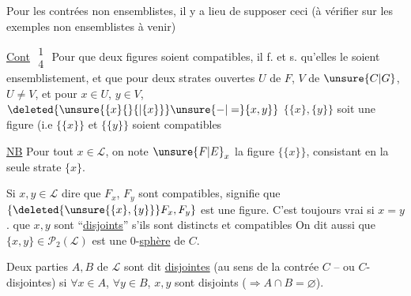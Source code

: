 
Pour les contrées non ensemblistes, il y a lieu de supposer ceci (à vérifier sur les exemples non ensemblistes à venir)

\uline{Cont} $\substack{1\\4}$ Pour que deux figures  soient \margin{\rule{0.35pt}{4.5\baselineskip}}compatibles, il f. et s. qu'elles le soient ensemblistement, et que pour deux  strates ouvertes $U$ de $F$, $V$ de $\unsure{C|G}$, $U\ne V$,  et pour  $x\in U$, $y\in V$, $\deleted{\unsure{\{x\}\{\}\{|\{x\}\}}\unsure{-|=}\{x,y\}}$ $\{\{x\},\{y\}\}$ soit une figure (i.e $\{\{x\}\}$ et $\{\{y\}\}$ soient compatibles


\uline{NB} Pour tout $x\in \mathcal L$, on note $\unsure{F|E}_x$ la figure $\{\{x\}\}$, consistant en la seule strate $\{x\}$.


 Si $x,y\in \mathcal L$ dire que $F_x$, $F_y$ sont compatibles, signifie que $\{\deleted{\unsure{\{x\},\{y\}}}F_x,F_y\}$ est  une figure. C'est toujours vrai si $x=y$.   que \deleted{$\{$} $x,y$ sont ``\uline{disjoints}'' s'ils sont distincts et compatibles  On dit aussi  que $\{x,y\}\in \mathcal P_2(\mathcal L)$ est une 0-\uline{sphère} de $C$.

Deux parties  $A,B$ de $\mathcal L$ sont dit \uline{disjointes} (au sens de la contrée $C$ -- ou $C$-disjointes) si $\forall x\in A$, $\forall y\in B$, $x,y$ sont disjoints ($\Longrightarrow A\cap B=\varnothing$).
